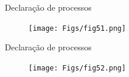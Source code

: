 \documentclass[aspectratio=169]{beamer}
\begin{document}
%	
%	
%	
%	
%		
%		
%	
%	


\begin{frame}{Declaração de processos}
	\justifying
	
	\begin{figure}[h]
	\centering
	\texttt{[image: Figs/fig51.png]}
	\end{figure}
	
	
	
%	
	
	
\end{frame}


\begin{frame}{Declaração de processos}
	\justifying
	
%	
	
	
	\begin{figure}[h]
		\centering
		\texttt{[image: Figs/fig52.png]}
	\end{figure}	
	
	
	
\end{frame}
\end{document}
